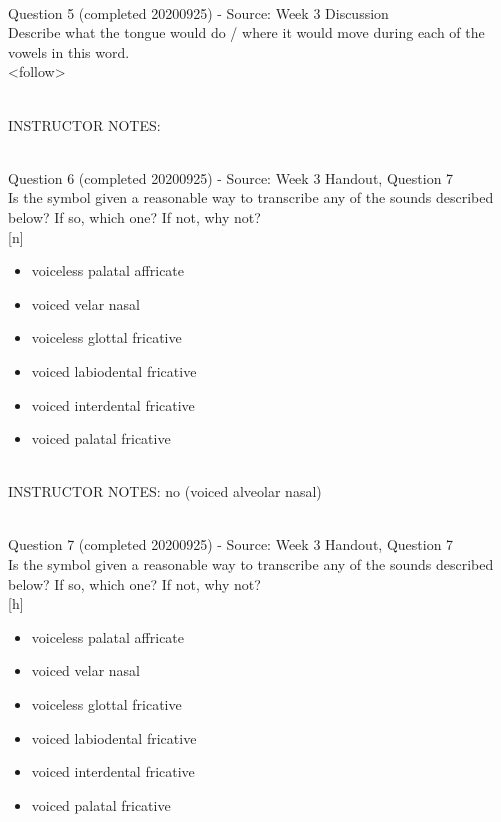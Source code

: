 \documentclass[12pt]{article}
\begin{document}
~\\

{\large Question 5} (completed 20200925) - Source: Week 3 Discussion\\

Describe what the tongue would do / where it would move during each of the vowels in this word.\\

<follow>


~\\
INSTRUCTOR NOTES: 


~\\

{\large Question 6} (completed 20200925) - Source: Week 3 Handout, Question 7\\

Is the symbol given a reasonable way to transcribe any of the sounds described below? If so, which one? If not, why not?\\

{[n]}

\begin{itemize} \item voiceless palatal affricate \item voiced velar nasal \item voiceless glottal fricative \item voiced labiodental fricative \item voiced interdental fricative \item voiced palatal fricative \end{itemize}


~\\
INSTRUCTOR NOTES: no (voiced alveolar nasal)


~\\

{\large Question 7} (completed 20200925) - Source: Week 3 Handout, Question 7\\

Is the symbol given a reasonable way to transcribe any of the sounds described below? If so, which one? If not, why not?\\

{[h]}

\begin{itemize} \item voiceless palatal affricate \item voiced velar nasal \item voiceless glottal fricative \item voiced labiodental fricative \item voiced interdental fricative \item voiced palatal fricative \end{itemize}
\end{document}
